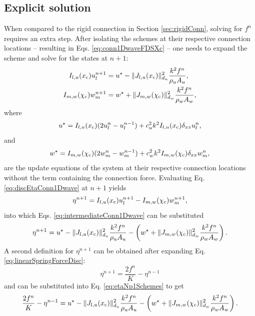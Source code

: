 \subsection{Explicit solution}\label{sec:explicitSolutionSpringConn}
When compared to the rigid connection in Section \ref{sec:rigidConn}, solving for $f^n$ requires an extra step. After isolating the schemes at their respective connection locations -- resulting in Eqs. \eqref{eq:conn1DwaveFDSXc} -- one needs to expand the scheme and solve for the states at $n+1$:
\begin{subequations}\label{eq:intermediateConn1Dwave}
    \begin{align}
        I_{l, u}(x_{\text{c}}) u_l^{n+1} &= u^\star - \lVert J_{l, u}(x_{\text{c}})\rVert_{d_u}^2 \frac{k^2f^n}{\rho_u A_u},\\
        I_{m, w}(\chi_{\text{c}}) w_m^{n+1} &= w^\star + \lVert J_{m, w}(\chi_{\text{c}})\rVert_{d_w}^2 \frac{k^2f^n}{\rho_w A_w},
    \end{align}
\end{subequations}
where
\begin{equation*}
    u^\star = I_{l, u}(x_{\text{c}})(2u_l^n - u_l^{n-1}) + c_u^2k^2I_{l, u}(x_{\text{c}})\delta_{xx}u_l^n,
\end{equation*}
and
\begin{equation*}
    w^\star = I_{m, w}(\chi_{\text{c}})(2w_m^n - w_m^{n-1}) + c_w^2k^2I_{m, w}(\chi_{\text{c}})\delta_{xx}w_m^n,
\end{equation*}
are the update equations of the system at their respective connection locations without the term containing the connection force. Evaluating Eq. \eqref{eq:discEtaConn1Dwave} at $n+1$ yields
\begin{equation*}
    \eta^{n+1} = I_{l, u}(x_{\text{c}}) u_l^{n+1} - I_{m, w}(\chi_{\text{c}}) w_m^{n+1},
\end{equation*}
into which Eqs. \eqref{eq:intermediateConn1Dwave} can be substituted
\begin{equation}\label{eq:etaNp1Schemes}
    \eta^{n+1} = u^\star - \lVert J_{l, u}(x_{\text{c}})\rVert_{d_u}^2 \frac{k^2f^n}{\rho_u A_u} - \left(w^\star + \lVert J_{m, w}(\chi_{\text{c}})\rVert_{d_w}^2 \frac{k^2f^n}{\rho_w A_w}\right).
\end{equation}
A second definition for $\eta^{n+1}$ can be obtained after expanding Eq. \eqref{eq:linearSpringForceDisc}:
\begin{equation}\label{eq:etaExpanded}
    \eta^{n+1} = \frac{2 f^n}{K} - \eta^{n-1}
\end{equation}
and can be substituted into Eq. \eqref{eq:etaNp1Schemes} to get
\begin{equation}
    \frac{2 f^n}{K} - \eta^{n-1} = u^\star - \lVert J_{l, u}(x_{\text{c}})\rVert_{d_u}^2 \frac{k^2f^n}{\rho_u A_u} - \left(w^\star + \lVert J_{m, w}(\chi_{\text{c}})\rVert_{d_w}^2 \frac{k^2f^n}{\rho_w A_w}\right).
\end{equation}
